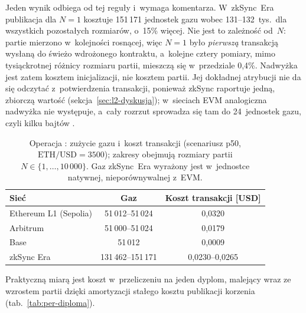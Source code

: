 Jeden wynik odbiega od tej reguły i~wymaga komentarza. W~zkSync~Era publikacja
dla $N=1$ kosztuje 151\,171 jednostek gazu wobec 131--132~tys.\ dla wszystkich
pozostałych rozmiarów, o~15\% więcej. Nie jest to zależność od~$N$: partie
mierzono w~kolejności rosnącej, więc $N=1$ było \emph{pierwszą} transakcją
wysłaną do świeżo wdrożonego kontraktu, a~kolejne cztery pomiary, mimo
tysiąckrotnej różnicy rozmiaru partii, mieszczą się w~przedziale 0{,}4\%.
Nadwyżka jest zatem kosztem inicjalizacji, nie kosztem partii. Jej dokładnej
atrybucji nie da się odczytać z~potwierdzenia transakcji, ponieważ zkSync
raportuje jedną, zbiorczą wartość 
(sekcja~\ref{sec:l2-dyskusja}); w~sieciach EVM analogiczna nadwyżka nie
występuje, a~cały rozrzut sprowadza się tam do 24~jednostek gazu, czyli
kilku bajtów .

\begin{table}[H]
  \centering
  \caption[Operacja : zużycie gazu i~koszt transakcji]{Operacja : zużycie gazu i~koszt transakcji
  (scenariusz p50, $\text{ETH}/\text{USD}=3500$); zakresy obejmują rozmiary
  partii $N \in \{1, \ldots, 10\,000\}$. Gaz zkSync~Era wyrażony jest
  w~jednostce natywnej, nieporównywalnej z~EVM.}
  \label{tab:issue-tx}
  \begin{tabular}{lcc}
  \toprule
  Sieć & Gaz & Koszt transakcji [USD] \\
  \midrule
  Ethereum L1 (Sepolia) & 51\,012--51\,024   & 0{,}0320 \\
  Arbitrum     & 51\,000--51\,024   & 0{,}0179 \\
  Base         & 51\,012            & 0{,}0009 \\
  zkSync Era   & 131\,462--151\,171 & 0{,}0230--0{,}0265 \\
  \bottomrule
  \end{tabular}
\end{table}

Praktyczną miarą jest koszt w~przeliczeniu na jeden dyplom, malejący wraz ze
wzrostem partii dzięki amortyzacji stałego kosztu publikacji korzenia
(tab.~\ref{tab:per-diploma}).

